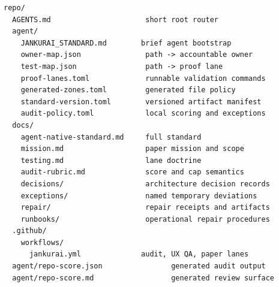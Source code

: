 \begin{lstlisting}[style=codebox]
repo/
  AGENTS.md                      short root router
  agent/
    JANKURAI_STANDARD.md        brief agent bootstrap
    owner-map.json               path -> accountable owner
    test-map.json                path -> proof lane
    proof-lanes.toml             runnable validation commands
    generated-zones.toml         generated file policy
    standard-version.toml        versioned artifact manifest
    audit-policy.toml            local scoring and exceptions
  docs/
    agent-native-standard.md     full standard
    mission.md                   paper mission and scope
    testing.md                   lane doctrine
    audit-rubric.md              score and cap semantics
    decisions/                   architecture decision records
    exceptions/                  named temporary deviations
    repair/                      repair receipts and artifacts
    runbooks/                    operational repair procedures
  .github/
    workflows/
      jankurai.yml              audit, UX QA, paper lanes
  agent/repo-score.json                generated audit output
  agent/repo-score.md                  generated review surface
\end{lstlisting}
